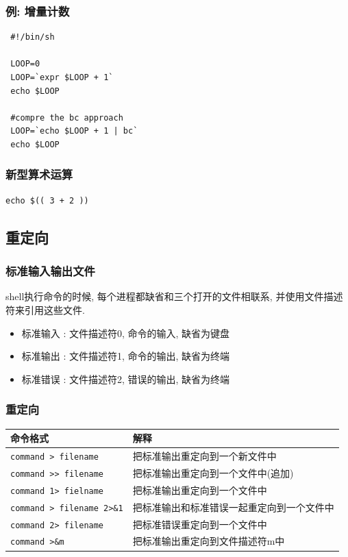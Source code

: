 \documentclass[compress]{beamer}
\begin{document}
\begin{frame}[fragile]
  \frametitle{例: 增量计数}

\begin{lstlisting}
 #!/bin/sh

 LOOP=0
 LOOP=`expr $LOOP + 1`
 echo $LOOP

 #compre the bc approach
 LOOP=`echo $LOOP + 1 | bc`
 echo $LOOP
\end{lstlisting}
\end{frame}

\begin{frame}[fragile]
  \frametitle{新型算术运算}
\begin{Verbatim}
echo $(( 3 + 2 ))
\end{Verbatim}
\end{frame}

\subsection{重定向}

\begin{frame}
	\frametitle{标准输入输出文件}
shell执行命令的时候, 每个进程都缺省和三个打开的文件相联系,
并使用文件描述符来引用这些文件.

\begin{itemize}
\item 标准输入 : 文件描述符0, 命令的输入, 缺省为键盘
\item 标准输出 : 文件描述符1, 命令的输出, 缺省为终端
\item 标准错误 : 文件描述符2, 错误的输出, 缺省为终端
\end{itemize}

\end{frame}

\begin{frame}[fragile]
\frametitle{重定向}

{\footnotesize
\begin{tabular}{l p{6cm}}\hline

命令格式 & 解释 \\ \hline

\verb=command > filename= & 把标准输出重定向到一个新文件中 \\

\verb=command >> filename= & 把标准输出重定向到一个文件中(追加) \\

\verb=command 1> fielname= & 把标准输出重定向到一个文件中 \\

\verb=command > filename 2>&1= &
把标准输出和标准错误一起重定向到一个文件中 \\

\verb=command 2> filename= & 把标准错误重定向到一个文件中 \\

\verb=command >&m= & 把标准输出重定向到文件描述符m中 \\ \hline

\end{tabular}}


\end{frame}
\end{document}
